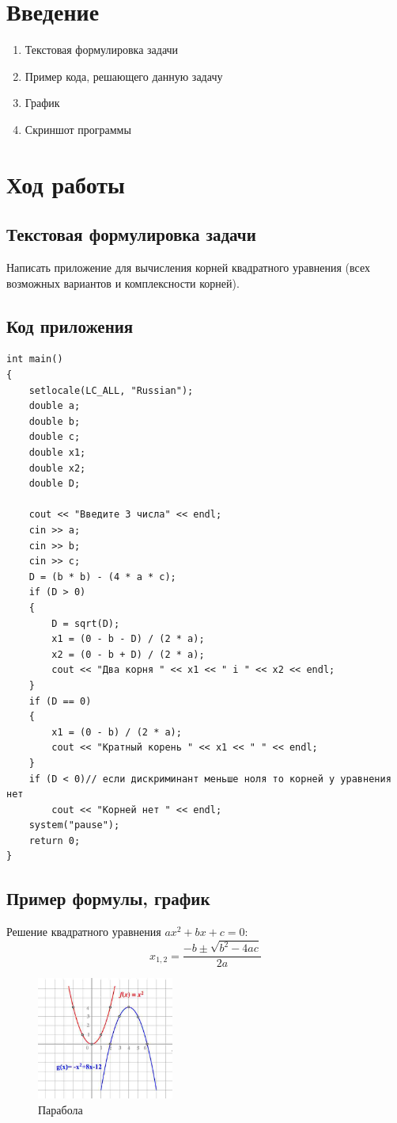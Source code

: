 \documentclass[12pt,a4paper]{scrartcl}
\begin{document}
	\section{Введение}
\label{sec:intro}


\begin{enumerate}
 \item Текстовая формулировка задачи
 \item Пример кода, решающего данную задачу
 \item График
 \item Скриншот программы
\end{enumerate}
\section{Ход работы}
\label{sec:exp}
\subsection{Текстовая формулировка задачи}
Написать приложение для вычисления корней квадратного уравнения (всех возможных вариантов и комплексности корней).
\subsection{Код приложения}
\label{sec:exp:code}
\begin{verbatim}
int main()
{
	setlocale(LC_ALL, "Russian");
	double a;
	double b;
	double c;
	double x1;
	double x2;
	double D;

	cout << "Введите 3 числа" << endl;
	cin >> a;
	cin >> b;
	cin >> c;
	D = (b * b) - (4 * a * c);
	if (D > 0)
	{
		D = sqrt(D);
		x1 = (0 - b - D) / (2 * a);
		x2 = (0 - b + D) / (2 * a);
		cout << "Два корня " << x1 << " i " << x2 << endl;
	}
	if (D == 0)
	{
		x1 = (0 - b) / (2 * a);
		cout << "Кратный корень " << x1 << " " << endl;
	}
	if (D < 0)// если дискриминант меньше ноля то корней у уравнения нет
		cout << "Корней нет " << endl;
	system("pause");
	return 0;
}
\end{verbatim}
\subsection{Пример формулы, график}
\label{sec:mathexample}

Решение квадратного уравнения \(ax^2+bx+c=0\):
\begin{equation}\label{eq:solv}
 x_{1,2}=\frac{-b\pm\sqrt{b^2-4ac}}{2a}
\end{equation}
\label{sec:picexample}
\begin{figure}[h]
	\centering
	\includegraphics[width=0.4\textwidth]{parabola.jpg}
	\caption{Парабола}\label{fig:par}
\end{figure}
\end{document}
